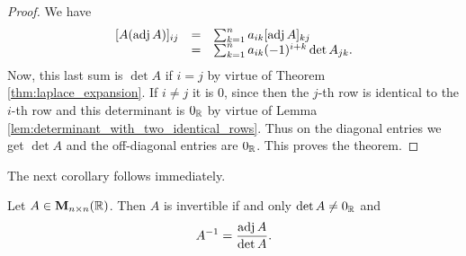 \begin{proof}
We have $$ \begin{array}{lll} [A(\operatorname{adj}{A})]_{ij} & = & \sum_{k=1}
^n a_{ik}[\operatorname{adj}{A}]_{kj} \\
& = & \sum _{k=1} ^n a_{ik}(-1)^{i + k}\det A_{jk}.
\end{array}$$Now, this last sum is $\det A$ if $i = j$ by virtue of Theorem \ref{thm:laplace_expansion}. If $i\neq
j$ it is $0$, since then the $j$-th row is identical to the $i$-th
row and this determinant is $0_{\mathbb{R}}$ by virtue of Lemma
\ref{lem:determinant_with_two_identical_rows}. Thus on the diagonal
entries we get $\det A$ and the off-diagonal entries are $0_{\mathbb{R}
}$. This proves the theorem.
\end{proof}
The next corollary follows immediately.
\begin{cor}\label{cor:inverse_via_adjoint}Let $A\in{\mathbf M}_{n\times n}( \mathbb{R})$.
Then $A$ is invertible if and only $\det A \neq 0_{\mathbb{R}}$ and
$$A^{-1} = \dfrac{\operatorname{adj}{A}}{\det A}.
$$
\end{cor}

\section*{}

